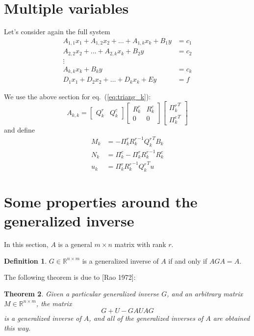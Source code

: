 \documentclass[]{article}
\newtheorem{theorem}{Theorem}[section]
\theoremstyle{definition}
\newtheorem{definition}[theorem]{Definition}
\newcommand{\BIN}{\begin{bmatrix}}
\newcommand{\BOUT}{\end{bmatrix}}
\begin{document}
\section{Multiple variables}
Let's consider again the full system
\begin{align}
A_{1,1} x_1 + A_{1,2} x_2 + \ldots + A_{1,k} x_k + B_1 y &= c_1 \label{eq:triang_1}\\
A_{2,2} x_2 + \ldots + A_{2,k} x_k + B_2 y &= c_2 \label{eq:triang_2}\\
\vdots& \nonumber\\
A_{k,k} x_k + B_k y &= c_k \label{eq:triang_k}\\
D_1 x_1 + D_2 x_2 + \ldots + D_k x_k + E y &= f \label{eq:other_}
\end{align}

We use the above section for eq.~(\ref{eq:triang_k}):
\begin{equation*}
	A_{k,k} = \BIN Q_k^r & Q_k^c \BOUT \BIN R_k^r & R_k^c \\ 0 & 0 \BOUT \BIN {\Pi_k^r}^T \\ {\Pi_k^c}^T \BOUT
\end{equation*}
and define
\begin{align*}
	M_k &= -\Pi^r_k {R_k^r}^{-1} {Q_k^r}^T B_k\\
	N_k &= \Pi^c_k - \Pi^r_k {R_k^r}^{-1} R_k^c\\
	u_k &= \Pi^r_k {R_k^r}^{-1} {Q_k^r}^T u
\end{align*}

\appendix
\section{Some properties around the generalized inverse}
In this section, $A$ is a general $m \times n$ matrix with rank $r$.

\begin{definition}
  $G \in \mathbb{R}^{n \times m}$ is a generalized inverse of $A$ if and only if $A G A = A$.
\end{definition}
The following theorem is due to [Rao 1972]:
\begin{theorem}
  Given a particular generalized inverse $G$, and an arbitrary matrix $M\in \mathbb{R}^{n \times m}$, the matrix
	\begin{equation}
		G + U - GAUAG
	\end{equation}
	is a generalized inverse of $A$, and all of the generalized inverses of $A$ are obtained this way.
\end{theorem}
\end{document}
